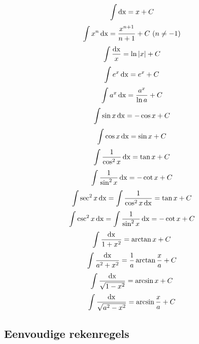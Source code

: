 \begin{ftrekenregel}
	
\begin{equation*}
\int \operatorname{dx} = x + C
\end{equation*}
\begin{equation*}
\int x^n \operatorname{dx}= \frac{x^{n+1}}{n+1}+C \ (n \neq -1)
\end{equation*}
\begin{equation*}
\int \frac{\operatorname{dx}}{x} = \ln{|x|}  +C
\end{equation*}
\begin{equation*}
\int e^{x} \operatorname{dx} = e^{x} +C
\end{equation*}
\begin{equation*}
\int a^{x} \operatorname{dx} = \frac{a^x}{\ln a}+C
\end{equation*}
\begin{equation*}
\int  \sin{x} \operatorname{dx} = - \cos{x}+C
\end{equation*}
\begin{equation*}
\int \cos{x} \operatorname{dx} = \sin{x}+C
\end{equation*}
\begin{equation*}
\int \frac{1}{\cos^2{x}} \operatorname{dx} = \tan{x} + C
\end{equation*}
\begin{equation*}
\int \frac{1}{\sin^2{x}} \operatorname{dx} = -\cot{x} + C
\end{equation*}
\begin{equation*}
\int \sec^2{x} \operatorname{dx} = \int \frac{1}{\cos^2{x} \operatorname{dx}} = \tan{x} + C
\end{equation*}
\begin{equation*}
\int \csc ^2{x} \operatorname{dx} = \int \frac{1}{\sin^2{x}} \operatorname{dx} = - \cot{x}+C
\end{equation*}
\begin{equation*}
\int \frac{\operatorname{dx}}{1+x^2} = \arctan{x} + C
\end{equation*}
\begin{equation*}
\int \frac{\operatorname{dx}}{a^2+x^2} = \frac{1}{a} \arctan{\frac{x}{a}}+C
\end{equation*}
\begin{equation*}
\int \frac{\operatorname{dx}}{\sqrt{1-x^2}}=\arcsin{x}+C
\end{equation*}
\begin{equation*}
\int \frac{\operatorname{dx}}{\sqrt{a^2-x^2}}=\arcsin{\frac{x}{a}}+C
\end{equation*}		
\end{ftrekenregel}


\subsection{Eenvoudige rekenregels}

